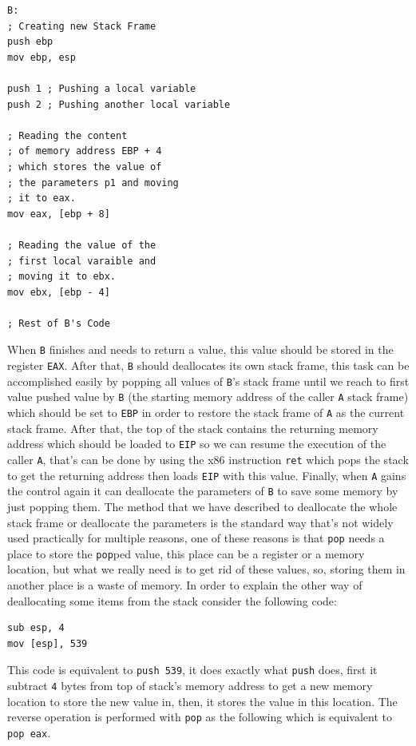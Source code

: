 \begin{lstlisting}
B:
; Creating new Stack Frame
push ebp
mov ebp, esp

push 1 ; Pushing a local variable
push 2 ; Pushing another local variable

; Reading the content 
; of memory address EBP + 4
; which stores the value of
; the parameters p1 and moving
; it to eax.
mov eax, [ebp + 8]

; Reading the value of the
; first local varaible and
; moving it to ebx.
mov ebx, [ebp - 4]

; Rest of B's Code
\end{lstlisting}

When \lstinline!B! finishes and needs to return a value, this value
should be stored in the register \lstinline!EAX!. After that,
\lstinline!B! should deallocates its own stack frame, this task can be
accomplished easily by popping all values of \lstinline!B!'s stack frame
until we reach to first value pushed value by \lstinline!B! (the
starting memory address of the caller \lstinline!A! stack frame) which
should be set to \lstinline!EBP! in order to restore the stack frame of
\lstinline!A! as the current stack frame. After that, the top of the
stack contains the returning memory address which should be loaded to
\lstinline!EIP! so we can resume the execution of the caller
\lstinline!A!, that's can be done by using the x86 instruction
\lstinline!ret! which pops the stack to get the returning address then
loads \lstinline!EIP! with this value. Finally, when \lstinline!A! gains
the control again it can deallocate the parameters of \lstinline!B! to
save some memory by just popping them. The method that we have described
to deallocate the whole stack frame or deallocate the parameters is the
standard way that's not widely used practically for multiple reasons,
one of these reasons is that \lstinline!pop! needs a place to store the
\lstinline!pop!ped value, this place can be a register or a memory
location, but what we really need is to get rid of these values, so,
storing them in another place is a waste of memory. In order to explain
the other way of deallocating some items from the stack consider the
following code:

\begin{lstlisting}
sub esp, 4
mov [esp], 539
\end{lstlisting}

This code is equivalent to \lstinline!push 539!, it does exactly what
\lstinline!push! does, first it subtract \lstinline!4! bytes from top of
stack's memory address to get a new memory location to store the new
value in, then, it stores the value in this location. The reverse
operation is performed with \lstinline!pop! as the following which is
equivalent to \lstinline!pop eax!.

